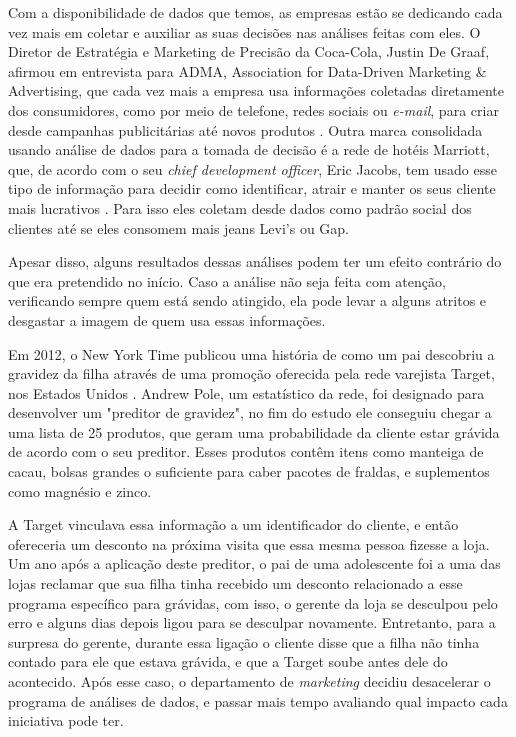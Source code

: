 \indent
\par Com a disponibilidade de dados que temos, as empresas estão se dedicando cada vez mais em coletar e auxiliar as suas decisões nas análises feitas com eles. O Diretor de Estratégia e Marketing de Precisão da Coca-Cola, Justin De Graaf, afirmou em entrevista para ADMA, Association for Data-Driven Marketing \& Advertising, que cada vez mais a empresa usa informações coletadas diretamente dos consumidores, como por meio de telefone, redes sociais ou \textit{e-mail}, para criar desde campanhas publicitárias até novos produtos \cite{Tan2017}. Outra marca consolidada usando análise de dados para a tomada de decisão é a rede de hotéis Marriott, que, de acordo com o seu \textit{chief development officer}, Eric Jacobs, tem usado esse tipo de informação para decidir como identificar, atrair e manter os seus cliente mais lucrativos \cite{Eisen2018}. Para isso eles coletam desde dados como padrão social dos clientes até se eles consomem mais jeans Levi's ou Gap.

\par Apesar disso, alguns resultados dessas análises podem ter um efeito contrário do que era pretendido no início. Caso a análise não seja feita com atenção, verificando sempre quem está sendo atingido, ela pode levar a alguns atritos e desgastar a imagem de quem usa essas informações.

\par Em 2012, o New York Time publicou uma história de como um pai descobriu a gravidez da filha através de uma promoção oferecida pela rede varejista Target, nos Estados Unidos \cite{Duhigg2012}. Andrew Pole, um estatístico da rede, foi designado para desenvolver um "preditor de gravidez", no fim do estudo ele conseguiu chegar a uma lista de 25 produtos, que geram uma probabilidade da cliente estar grávida de acordo com o seu preditor. Esses produtos contêm itens como manteiga de cacau, bolsas grandes o suficiente para caber pacotes de fraldas, e suplementos como magnésio e zinco.

\par A Target vinculava essa informação a um identificador do cliente, e então ofereceria um desconto na próxima visita que essa mesma pessoa fizesse a loja. Um ano após a aplicação deste preditor, o pai de uma adolescente foi a uma das lojas reclamar que sua filha tinha recebido um desconto relacionado a esse programa específico para grávidas, com isso, o gerente da loja se desculpou pelo erro e alguns dias depois ligou para se desculpar novamente. Entretanto, para a surpresa do gerente, durante essa ligação o cliente disse que a filha não tinha contado para ele que estava grávida, e que a Target soube antes dele do acontecido. Após esse caso, o departamento de \textit{marketing} decidiu desacelerar o programa de análises de dados, e passar mais tempo avaliando qual impacto cada iniciativa pode ter.
